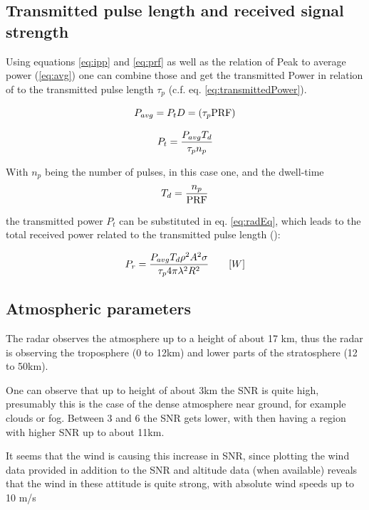\subsection{Transmitted pulse length and received signal strength}

Using equations \ref{eq:ipp} and \ref{eq:prf} as well as the relation of Peak to average power (\ref{eq:avg}) one can combine those and get the transmitted Power in relation of to the transmitted pulse length $\tau_p$ (c.f. eq. \ref{eq:transmittedPower}).

\begin{equation}
	\centering
	\label{eq:avg}
	P_{avg} = P_t D = (\tau_p \textrm{PRF} )
\end{equation}

\begin{equation}
	\centering
	\label{eq:transmittedPower}
	P_{t} = \frac{P_{avg} T_d}{\tau_p n_p} 
\end{equation}

With $n_p$ being the number of pulses, in this case one, and the dwell-time 
\begin{equation}
	\label{eq:dwell}
	\centering
	T_d = \frac{n_p}{\textrm{PRF}}
\end{equation}

the transmitted power $P_t$ can be substituted in eq. \ref{eq:radEq}, which leads to the total received power related to the transmitted pulse length (\citep[c.f.][chap. 2.10]{richards2010principles}):


\begin{equation}
	\label{eq:relation}
	\centering
	P_r = \frac{P_{avg} T_d \rho^2 A^2 \sigma }{\tau_p 4 \pi \lambda^2 R^2} \qquad	[W]
\end{equation}

\subsection{Atmospheric parameters}

The radar observes the atmosphere up to a height of about 17 km, thus the radar is observing the troposphere (0 to 12km) and lower parts of the stratosphere (12 to 50km).

One can observe that up to height of about 3km the SNR is quite high, presumably this is the case of the dense atmosphere near ground, for example clouds or fog. Between 3 and 6 the SNR gets lower, with then having a region with higher SNR up to about 11km.

It seems that the wind is causing this increase in SNR, since plotting the wind data provided in addition to the SNR and altitude data (when available) reveals that the wind in these attitude is quite strong, with absolute wind speeds up to 10 m/s


